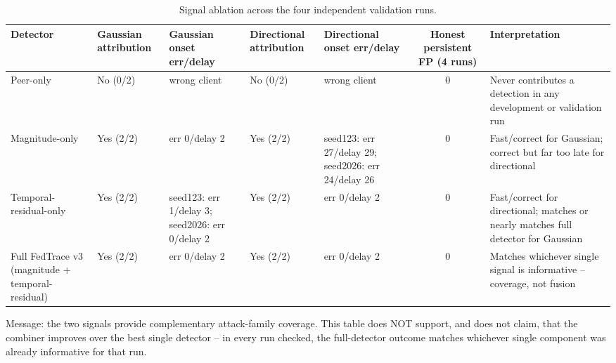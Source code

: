 \begin{table}[t]
\centering
\caption{Signal ablation across the four independent validation runs.}
\label{tab:ablation}
\begin{tabular}{lllllcp{3.2cm}}
\toprule
Detector & Gaussian attribution & Gaussian onset err/delay & Directional attribution & Directional onset err/delay & Honest persistent FP (4 runs) & Interpretation \\
\midrule
Peer-only & No (0/2) & wrong client & No (0/2) & wrong client & 0 & Never contributes a detection in any development or validation run \\
Magnitude-only & Yes (2/2) & err 0/delay 2 & Yes (2/2) & seed123: err 27/delay 29; seed2026: err 24/delay 26 & 0 & Fast/correct for Gaussian; correct but far too late for directional \\
Temporal-residual-only & Yes (2/2) & seed123: err 1/delay 3; seed2026: err 0/delay 2 & Yes (2/2) & err 0/delay 2 & 0 & Fast/correct for directional; matches or nearly matches full detector for Gaussian \\
Full FedTrace v3 (magnitude + temporal-residual) & Yes (2/2) & err 0/delay 2 & Yes (2/2) & err 0/delay 2 & 0 & Matches whichever single signal is informative -- coverage, not fusion \\
\bottomrule
\end{tabular}
\vspace{2pt}\par\raggedright\footnotesize Message: the two signals provide complementary attack-family coverage. This table does NOT support, and does not claim, that the combiner improves over the best single detector -- in every run checked, the full-detector outcome matches whichever single component was already informative for that run.
\end{table}
